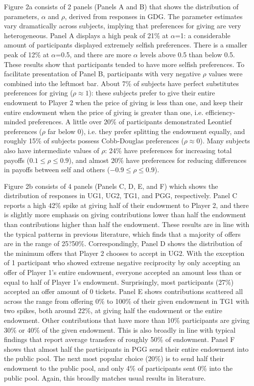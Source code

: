 \documentclass[12pt]{article}
\begin{document}
{\color{green}Figure 2a} consists of 2 panels (Panels A and B) that shows the distribution of parameters, \(\alpha\) and \(\rho\), derived from responses in GDG.  The parameter estimates vary dramatically across subjects, implying that preferences for giving are very heterogeneous. Panel A displays a high peak of 21\% at \(\alpha\)=1: a considerable amount of participants displayed extremely selfish preferences. There is a smaller peak of 12\% at \(\alpha\)=0.5, and there are more \(\alpha\) levels above 0.5 than below 0.5. These results show that participants tended to have more selfish preferences. To facilitate presentation of Panel B, participants with very negative \(\rho\) values were combined into the leftmost bar. About 7\% of subjects have perfect substitutes preferences for giving (\(\rho \approx 1\)): these subjects prefer to give their entire endowment to Player 2 when the price of giving is less than one, and keep their entire endowment when the price of giving is greater than one, i.e. efficiency-minded preferences. A little over 20\% of participants demonstrated Leontief preferences (\(\rho\) far below 0), i.e. they prefer splitting the endowment equally, and roughly 15\% of subjects possess Cobb-Douglas preferences (\(\rho \approx 0\)). Many subjects also have intermediate values of \(\rho\): 24\% have preferences for increasing total payoffs (\(0.1 \leq \rho \leq 0.9\)), and almost 20\% have preferences for reducing differences in payoffs between self and others (\(-0.9 \leq \rho \leq 0.9\)).


{\color{green}Figure 2b} consists of 4 panels (Panels C, D, E, and F) which shows the distribution of responses in UG1, UG2, TG1, and PGG, respectively. Panel C reports a high 42\% spike at giving half of their endowment to Player 2, and there is slightly more emphasis on giving contributions lower than half the endowment than contributions higher than half the endowment. These results are in line with the typical patterns in previous literature, which finds that a majority of offers are in the range of 25?50\%. Correspondingly, Panel D shows the distribution of the minimum offers that Player 2 chooses to accept in UG2. With the exception of 1 participant who showed extreme negative reciprocity by only accepting an offer of Player 1's entire endowment, everyone accepted an amount less than or equal to half of Player 1's endowment. Surprisingly, most participants (27\%) accepted an offer amount of 0 tickets. Panel E shows contributions scattered all across the range from offering 0\% to 100\% of their given endowment in TG1 with two spikes, both around 22\%, at giving half the endowment or the entire endowment. Other contributions that have more than 10\% participants are giving 30\% or 40\% of the given endowment. This is also broadly in line with typical findings that report average transfers of roughly 50\% of endowment. Panel F shows that almost half the participants in PGG send their entire endowment into the public pool. The next most popular choice (20\%) is to send half their endowment to the public pool, and only 4\% of participants sent 0\% into the public pool. Again, this broadly matches usual results in literature.
\end{document}
